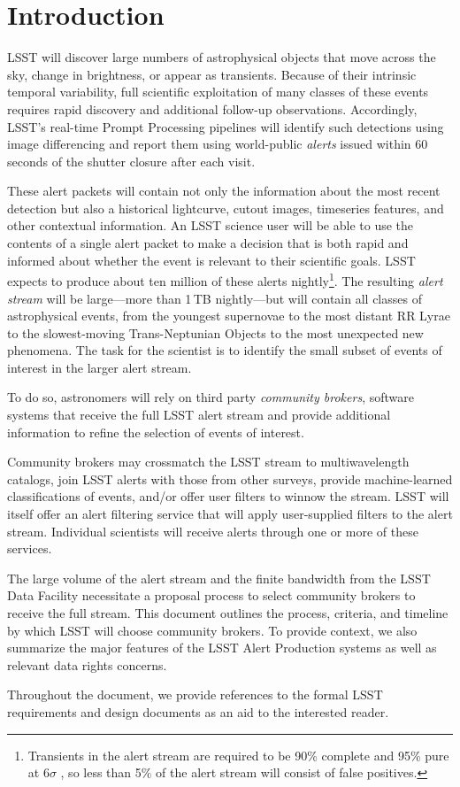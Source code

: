\section{Introduction}\label{sec:introduction}

LSST will discover large numbers of astrophysical objects that move across the sky, change in brightness, or appear as transients.
Because of their intrinsic temporal variability, full scientific exploitation of many classes of these events requires rapid discovery and additional follow-up observations.
Accordingly, LSST's real-time Prompt Processing pipelines will identify such detections using image differencing and report them using world-public \textit{alerts} issued within 60 seconds of the shutter closure after each visit.

These alert packets will contain not only the information about the most recent detection but also a historical lightcurve, cutout images, timeseries features, and other contextual information.
An LSST science user will be able to use the contents of a single alert packet to make a decision that is both rapid and informed about whether the event is relevant to their scientific goals.
LSST expects to produce about ten million of these alerts nightly\footnote{Transients in the alert stream are required to be 90\% complete and 95\% pure at 6$\sigma$ , so less than 5\% of the alert stream will consist of false positives.}.
The resulting \textit{alert stream} will be large---more than 1\,TB nightly---but will contain all classes of astrophysical events, from the youngest supernovae to the most distant RR Lyrae to the slowest-moving Trans-Neptunian Objects to the most unexpected new phenomena.
The task for the scientist is to identify the small subset of events of interest in the larger alert stream.

To do so, astronomers will rely on third party \textit{community brokers}, software systems that receive the full LSST alert stream and provide additional information to refine the selection of events of interest.

Community brokers may crossmatch the LSST stream to multiwavelength catalogs, join LSST alerts with those from other surveys, provide machine-learned classifications of events, and/or offer user filters to winnow the stream.
LSST will itself offer an alert filtering service that will apply user-supplied filters to the alert stream.
Individual scientists will receive alerts through one or more of these services.

The large volume of the alert stream and the finite bandwidth from the LSST Data Facility necessitate a proposal process to select community brokers to receive the full stream.
This document outlines the process, criteria, and timeline by which LSST will choose community brokers.
To provide context, we also summarize the major features of the LSST Alert Production systems as well as relevant data rights concerns.

Throughout the document, we provide references to the formal LSST requirements and design documents as an aid to the interested reader.
